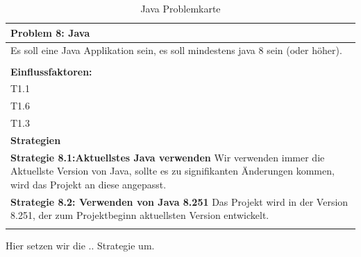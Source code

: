 \documentclass[fontsize=12pt,paper=a4,twoside]{scrartcl}
\begin{document}
\begin{table}[H]
    \centering
    \begin{tabular}{|p{15cm}|}
    \hline
          \textbf{Problem 8: Java}  \\ \hline
	Es soll eine Java Applikation sein, es soll mindestens java 8 sein (oder höher). \\
         \\ \hline
          \textbf{Einflussfaktoren: } \\
	T1.1 \\
	T1.6 \\
	T1.3 \\
          \hline
          \textbf{Strategien} \\ \hline
            {}          
           \label{strategie:8.1}     
          \textbf{Strategie 8.1:Aktuellstes Java verwenden} Wir verwenden immer die Aktuellste Version von Java, sollte es zu signifikanten Änderungen kommen, wird das Projekt an diese angepasst.\\        
  {}          
           \label{strategie:8.2}              
          \textbf{Strategie 8.2: Verwenden von Java 8.251} Das Projekt wird in der Version 8.251, der zum Projektbeginn aktuellsten Version entwickelt. \\
	 \\ \hline
    \end{tabular}

    \caption{Java Problemkarte}
    \label{tab:ProblemKarte8}
\end{table}
Hier setzen wir die .. Strategie um. \\
\end{document}

